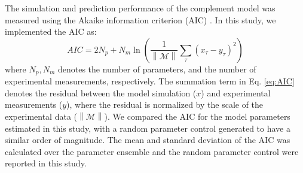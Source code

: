 \documentclass[12pt]{article}
\makeatletter
\renewcommand\subsubsection{\@startsection
	{subsubsection}{2}{0mm}
	{-0.05in}
	{-0.5\baselineskip}
	{\normalfont\normalsize\itshape}}
\newcommand{\norm}[1]{\left\lVert#1\right\rVert}
\makeatother
\begin{document}
The simulation and prediction performance of the complement model was measured using the Akaike information criterion (AIC) \cite{Akaike1974}.
In this study, we implemented the AIC as:
\begin{equation}\label{eq:AIC}
	AIC = 2N_{p}+N_{m}\ln\left(\frac{1}{\norm{\mathcal{M}}}\sum_{\tau}\left(x_{\tau}-y_{\tau}\right)^2\right)
\end{equation}where $N_{p}, N_{m}$ denotes the number of parameters, and the number of experimental measurements, respectively.
The summation term in Eq. \eqref{eq:AIC} denotes the residual between the model simulation ($x$) and experimental measurements ($y$),
where the residual is normalized by the scale of the experimental data ($\norm{\mathcal{M}}$).
We compared the AIC for the model parameters estimated in this study, with a random parameter control generated to have a similar order of magnitude.
The mean and standard deviation of the AIC was calculated over the parameter ensemble and the random parameter control were reported in this study.

%
\end{document}
